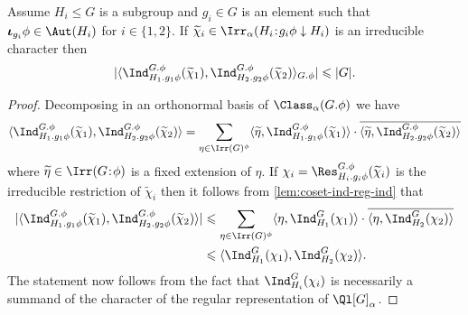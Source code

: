 \documentclass[eqthmnum,nocolour,skinny]{jt-calcs}
\newcommand\sd{
	\mathchoice{\mkern1.5mu}{\mkern1.5mu}{}{}%
	{:}%
	\mathchoice{\mkern1.5mu}{\mkern1.5mu}{}{}
}
\begin{document}
\begin{cor}\label{lem:triv-bound-inner-prod}
Assume $H_i \leqslant G$ is a subgroup and $g_i \in G$ is an element such that $\boldsymbol{\iota}_{g_i}\phi \in \Aut(H_i)$ for $i \in \{1,2\}$. If $\widetilde{\chi}_i \in \Irr_{\alpha}(H_i\sd g_i\phi \downarrow H_i)$ is an irreducible character then
\begin{equation*}
|\langle \Ind_{H_1.g_1\phi}^{G.\phi}(\widetilde{\chi}_1),\Ind_{H_2.g_2\phi}^{G.\phi}(\widetilde{\chi}_2) \rangle_{G.\phi}| \leqslant |G|.
\end{equation*}
\end{cor}

\begin{proof}
Decomposing in an orthonormal basis of $\Class_{\alpha}(G.\phi)$ we have
\begin{equation*}
\langle \Ind_{H_1.g_1\phi}^{G.\phi}(\widetilde{\chi}_1),\Ind_{H_2.g_2\phi}^{G.\phi}(\widetilde{\chi}_2) \rangle = \sum_{\eta \in \Irr(G)^{\phi}} \langle \widetilde{\eta}, \Ind_{H_1.g_1\phi}^{G.\phi}(\widetilde{\chi}_1)\rangle \cdot \overline{\langle \widetilde{\eta}, \Ind_{H_2.g_2\phi}^{G.\phi}(\widetilde{\chi}_2)\rangle}
\end{equation*}
where $\widetilde{\eta} \in \Irr(G\sd\phi)$ is a fixed extension of $\eta$. If $\chi_i = \Res_{H_i.g_i\phi}^{G.\phi}(\widetilde{\chi}_i)$ is the irreducible restriction of $\widetilde{\chi}_i$ then it follows from \cref{lem:coset-ind-reg-ind} that
\begin{align*}
|\langle \Ind_{H_1.g_1\phi}^{G.\phi}(\widetilde{\chi}_1),\Ind_{H_2.g_2\phi}^{G.\phi}(\widetilde{\chi}_2) \rangle| &\leqslant \sum_{\eta \in \Irr(G)^{\phi}} \langle \eta, \Ind_{H_1}^G(\chi_1)\rangle \cdot \overline{\langle \eta, \Ind_{H_2}^G(\chi_2)\rangle}\\
&\leqslant \langle \Ind_{H_1}^G(\chi_1), \Ind_{H_2}^G(\chi_2)\rangle.
\end{align*}
The statement now follows from the fact that $\Ind_{H_i}^G(\chi_i)$ is necessarily a summand of the character of the regular representation of $\Ql[G]_{\alpha}$.
\end{proof}
\end{document}
